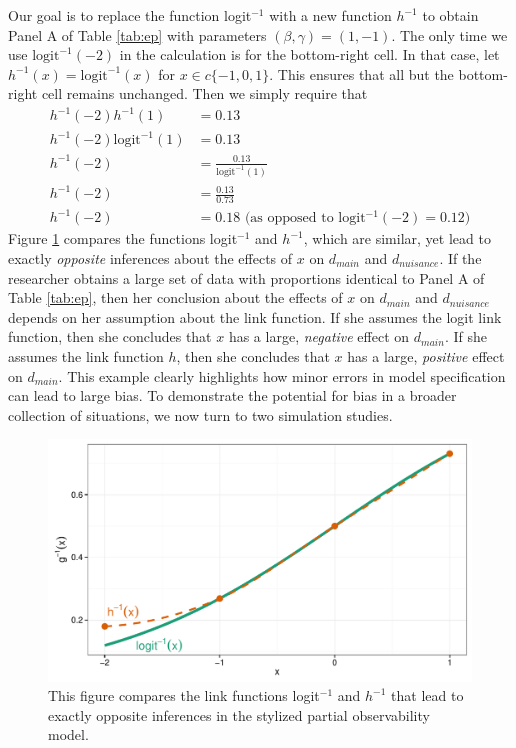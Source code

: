 \documentclass[10pt]{article}
\begin{document}
Our goal is to replace the function logit$^{-1}$ with a new function $h^{-1}$ to obtain Panel A of Table \ref{tab:ep} with parameters $(\beta, \gamma) = (1, -1)$. 
The only time we use $\text{logit}^{-1} (-2)$ in the calculation is for the bottom-right cell. In that case, let $h^{-1}(x) = \text{logit}^{-1}(x)$ for $x \in c\{ -1, 0, 1\}$. 
This ensures that all but the bottom-right cell remains unchanged. 
Then we simply require that 
\begin{align*}
h^{-1}(-2)h^{-1}(1) &= 0.13\\
h^{-1}(-2)\text{logit}^{-1}(1) &= 0.13\\
h^{-1}(-2) &= \frac{0.13}{\text{logit}^{-1}(1)}\\
h^{-1}(-2) &= \frac{0.13}{0.73}\\
h^{-1}(-2) & = 0.18 \text{ (as opposed to logit$^{-1}(-2) = 0.12$)}
\end{align*}
Figure \ref{fig:example} compares the functions logit$^{-1}$ and $h^{-1}$, which are similar, yet lead to exactly \textit{opposite} inferences about the effects of $x$ on $d_{main}$ and $d_{nuisance}$. 
If the researcher obtains a large set of data with proportions identical to Panel A of Table \ref{tab:ep}, then her conclusion about the effects of $x$ on $d_{main}$ and $d_{nuisance}$ depends on her assumption about the link function. 
If she assumes the logit link function, then she concludes that $x$ has a large, \textit{negative} effect on $d_{main}$. 
If she assumes the link function $h$, then she concludes that $x$ has a large, \textit{positive} effect on $d_{main}$. 
This example clearly highlights how minor errors in model specification can lead to large bias. 
To demonstrate the potential for bias in a broader collection of situations, we now turn to two simulation studies.

\begin{figure}[h]
\begin{center}
\includegraphics[scale = .6]{figs/example.pdf}
\caption{This figure compares the link functions logit$^{-1}$ and $h^{-1}$ that lead to exactly opposite inferences in the stylized partial observability model.}\label{fig:example}
\end{center}
\end{figure}
\end{document}
